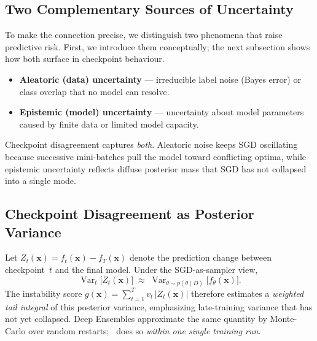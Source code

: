 \subsection{Two Complementary Sources of Uncertainty}

To make the connection precise, we distinguish two phenomena that raise predictive risk.  
First, we introduce them conceptually; the next subsection shows how both surface in checkpoint behaviour.

\begin{itemize}
  \item \textbf{Aleatoric (data) uncertainty} — irreducible label noise (Bayes error) or class overlap that no model can resolve.
  \item \textbf{Epistemic (model) uncertainty} — uncertainty about model parameters caused by finite data or limited model capacity.
\end{itemize}

Checkpoint disagreement captures \emph{both}.  
Aleatoric noise keeps SGD oscillating because successive mini-batches pull the model toward conflicting optima, while epistemic uncertainty reflects diffuse posterior mass that SGD has not collapsed into a single mode.

\subsection{Checkpoint Disagreement as Posterior Variance}

Let $Z_t(\bm{x}) = f_t(\bm{x}) - f_T(\bm{x})$ denote the prediction change between checkpoint~$t$ and the final model.  
Under the SGD-as-sampler view,
\begin{equation}
  \operatorname{Var}_{t}\bigl[Z_t(\bm{x})\bigr]
  \;\approx\;
  \operatorname{Var}_{\theta\sim p(\theta\mid D)}\bigl[f_{\theta}(\bm{x})\bigr].
\end{equation}
The instability score
$
  g(\bm{x})=\sum_{t=1}^{T} v_t\,|Z_t(\bm{x})|
$
therefore estimates a \emph{weighted tail integral} of this posterior variance, emphasizing late-training variance that has not yet collapsed.  
Deep Ensembles approximate the same quantity by Monte-Carlo over random restarts; \sptd\ does so \emph{within one single training run}.

